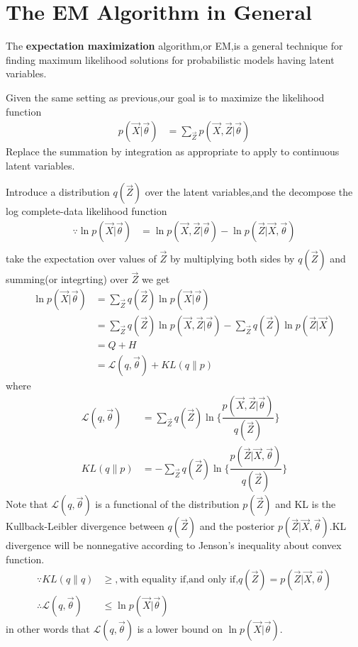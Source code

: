 \section{The EM Algorithm in General}
The \textbf{expectation maximization} algorithm,or EM,is a general technique for finding maximum likelihood solutions for probabilistic models having latent variables.

Given the same setting as previous,our goal is to maximize the likelihood function
\begin{align}
p(\vec{X}|\vec{\theta}) &=\sum_{\vec{Z}}p(\vec{X},\vec{Z}|\vec{\theta}) 
\end{align}
Replace the summation by integration as appropriate to apply to continuous latent variables.

Introduce a distribution $q(\vec{Z})$ over the latent variables,and the decompose the log complete-data likelihood function
\begin{align}
\because \ln p(\vec{X}|\vec{\theta}) &=\ln p(\vec{X},\vec{Z}|\vec{\theta}) -\ln p(\vec{Z}|\vec{X},\vec{\theta}) \\
\end{align}
take the expectation over values of $\vec{Z}$ by multiplying both sides by $q(\vec{Z})$ and summing(or integrting) over $\vec{Z}$ we get
\begin{align}
\ln p(\vec{X}|\vec{\theta}) 
&=\sum_{\vec{Z}}q(\vec{Z})\ln p(\vec{X}|\vec{\theta}) \\
&=\sum_{\vec{Z}}q(\vec{Z})\ln p(\vec{X},\vec{Z}|\vec{\theta})-\sum_{\vec{Z}}q(\vec{Z})\ln p(\vec{Z}|\vec{X}) \\
&=Q+H \\
&=\mathcal{L}(q,\vec{\theta})+KL(q\parallel p)
\end{align}
where
\begin{align}\label{eqn:complete-data log likelihood decomposition}
\mathcal{L}(q,\vec{\theta})
&=\sum_{\vec{Z}}q(\vec{Z})\ln
\{\dfrac{p(\vec{X},\vec{Z}|\vec{\theta})}{q(\vec{Z})} \} \\
KL(q\parallel p)
&=-\sum_{\vec{Z}}{q(\vec{Z})\ln
	\{\dfrac{p(\vec{Z}|\vec{X},\vec{\theta})}
		 {q(\vec{Z})}\}}
\end{align}
Note that $\mathcal{L}(q,\vec{\theta})$ is a functional of the distribution $p(\vec{Z})$ and KL is the Kullback-Leibler divergence between $q(\vec{Z})$ and the posterior $p(\vec{Z}|\vec{X},\vec{\theta})$.KL divergence will be nonnegative according to Jenson's inequality about convex function.
\begin{align}
\because KL(q\parallel q)&\geq,\text{with equality if,and only if,}q(\vec{Z})=p(\vec{Z}|\vec{X},\vec{\theta})\\
\therefore
\mathcal{L}	(q,\vec{\theta})&\leq\ln p(\vec{X}|\vec{\theta})
\end{align}
in other words that $\mathcal{L}(q,\vec{\theta})$ is a lower bound on $\ln p(\vec{X}|\vec{\theta})$.

